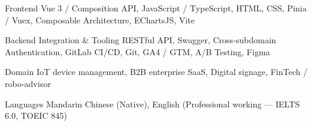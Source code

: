 \vspace*{4mm}

\begin{cvskills}

  \cvskill
  {Frontend}
  {
    Vue 3 / Composition API, JavaScript / TypeScript, HTML, CSS, Pinia / Vuex,
    Composable Architecture, EChartsJS, Vite
  }

  \cvskill
  {Backend Integration \& Tooling}
  {
    RESTful API, Swagger, Cross-subdomain Authentication, GitLab CI/CD, Git,
    GA4 / GTM, A/B Testing, Figma
  }

  \cvskill
  {Domain}
  {
    IoT device management, B2B enterprise SaaS, Digital signage, FinTech / robo-advisor
  }

  \cvskill
  {Languages}
  {
    Mandarin Chinese (Native), English (Professional working --- IELTS 6.0, TOEIC 845)
  }

\end{cvskills}
